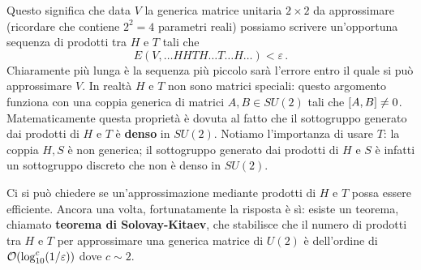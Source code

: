 \begin{enumerate}
    Questo significa che data $V$ la generica matrice unitaria $2 \times 2$ da approssimare (ricordare che contiene $2^2 = 4$ parametri reali) possiamo scrivere un'opportuna sequenza di prodotti tra $H$ e $T$ tali che
    \begin{equation*}
        E(V, \ldots H H T H \ldots T \ldots H \ldots) < \varepsilon \, .
    \end{equation*}
    Chiaramente più lunga è la sequenza più piccolo sarà l'errore entro il quale si può approssimare $V$. In realtà $H$ e $T$ non sono matrici speciali: questo argomento funziona con una coppia generica di matrici $A, B \in SU(2)$ tali che $\comm{A}{B} \neq 0$. Matematicamente questa proprietà è dovuta al fatto che il sottogruppo generato dai prodotti di $H$ e $T$ è \textbf{denso} in $SU(2)$. Notiamo l'importanza di usare $T$: la coppia $H, S$ \`e non generica; il sottogruppo generato dai prodotti di $H$ e $S$ \`e infatti  un sottogruppo discreto che non è denso in $SU(2)$.
    
    \noindent Ci si può chiedere se un'approssimazione mediante prodotti di $H$ e $T$ possa essere efficiente. Ancora una volta, fortunatamente la risposta è sì: esiste un teorema, chiamato \textbf{teorema di Solovay-Kitaev}, che stabilisce che il numero di prodotti tra $H$ e $T$ per approssimare una generica matrice di $U(2)$ è dell'ordine di $\order{\log_{10}^c(1/\varepsilon)}$ dove $c \sim 2$. 
    
\end{enumerate}